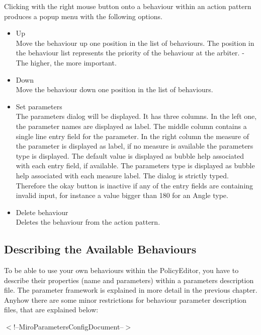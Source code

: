 Clicking with the right mouse button onto a behaviour within an action
pattern produces a popup menu with the following options.
\begin{itemize}
\item Up \\
  Move the behaviour up one position in the list of behaviours. The
  position in the behaviour list represents the priority of the
  behaviour at the arbiter. - The higher, the more important.
\item Down \\
  Move the behaviour down one position in the list of behaviours.
\item Set parameters \\
  The parameters dialog will be displayed. It has three columns. In
  the left one, the parameter names are displayed as label. The middle column
  contains a single line entry field for the parameter. In the right column the
  measure of the parameter is displayed as label, if no measure is available
  the parameters type is displayed. The default value is
  displayed as bubble help associated with each entry field, if
  available. The parameters type is displayed as bubble help
  associated with each measure label. The dialog is strictly
  typed. Therefore the okay button is inactive if any of the entry fields
  are containing invalid input, for instance a value bigger than 180
  for an Angle type.
\item Delete behaviour \\
  Deletes the behaviour from the action pattern.
\end{itemize}

\subsection{Describing the Available Behaviours}
\label{SEC:BehaviourDescription}

To be able to use your own behaviours within the PolicyEditor, you
have to describe their properties (name and parameters) within a
parameters description file. The parameter framework is explained in
more detail in the previous chapter. Anyhow there are some minor
restrictions for behaviour parameter description files, that are
explained below:

$<$!--MiroParametersConfigDocument--$>$

